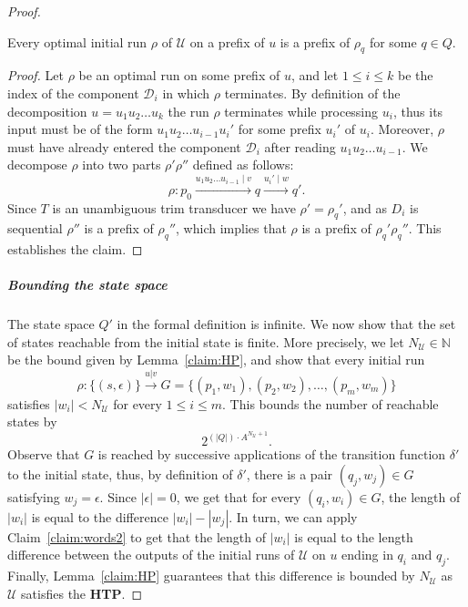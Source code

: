 \documentclass[a4paper,UKenglish,cleveref, autoref, thm-restate,authorcolumns, colorlinks]{lipics-v2021}
\newcommand\calD{\mathcal{D}}
\newcommand\calU{\mathcal{U}}
\newcommand{\HTP}[0]{\textbf{HTP}}
\begin{document}
{\begin{proof}
    \begin{claim}\label{claim:fin}
    Every optimal initial run $\rho$ of $\calU$ on a prefix of $u$
    is a prefix of $\rho_q$ for some  $q \in Q$.
    \end{claim}

    \begin{proof}
    Let $\rho$ be an optimal run on some prefix of $u$,
    and let $1 \leq i \leq k$ be the index of the component $\calD_i$ in which $\rho$ terminates.
    By definition of the decomposition $u = u_1 u_2 \dots u_k$ the run $\rho$ terminates while processing $u_i$,
    thus its input must be of the form $u_1 u_2 \dots u_{i-1} u_i'$
    for some prefix $u_i'$ of $u_i$.
    Moreover, $\rho$ must have already entered the component $\calD_i$
    after reading $u_1 u_2 \dots u_{i-1}$.
    We decompose $\rho$ into two parts $\rho'\rho''$ defined as follows:
    \[
        \rho: p_0 \xrightarrow{u_1 u_2 \dots u_{i-1} \mid v} q \xrightarrow{u_i' \mid w} q'.
    \]
    Since $T$ is an unambiguous trim transducer we have $\rho' = \rho_q'$,
    and as $D_i$ is sequential $\rho''$ is a prefix of $\rho_q''$, 
    which implies that $\rho$ is a prefix of $\rho_q' \rho_q''$.
    This establishes the claim.
    \end{proof}


   \subparagraph*{Bounding the state space}
    The state space $Q'$ in the formal definition is infinite.
    We now show that the set of states reachable from the initial state is finite.
    More precisely, we let $N_\calU \in \mathbb{N}$ be the bound given by Lemma~\ref{claim:HP},
    and show that every initial run
    \[
        \rho : \{(s,\epsilon)\} \xrightarrow{u|v} G =  \{(p_1,w_1), (p_2,w_2), \ldots, (p_m,w_m)\}
    \]
    satisfies $|w_i| < N_\calU$ for every $1 \leq i \leq m$.
    This bounds the number of reachable states by
    \[
    2^{(|Q|) \cdot A^{N_\calU+1}}.
    \]
    Observe that $G$ is reached by successive applications of the transition function $\delta'$
    to the initial state, thus,  by definition of $\delta'$, there is a pair $(q_j,w_j) \in G$
    satisfying $w_j = \epsilon$.
    Since $|\epsilon| = 0$,
    we get that for every $(q_i,w_i) \in G$,
    the length of $|w_i|$ is equal to the difference $|w_i| - |w_j|$.
    In turn, we can apply Claim~\ref{claim:words2} to get that the length of $|w_i|$ is equal to 
    the length difference between the outputs of the initial runs of $\calU$ on $u$
    ending in $q_i$ and $q_j$.
    Finally, Lemma~\ref{claim:HP}
    guarantees that this difference is bounded by $N_\calU$
    as $\calU$ satisfies the \HTP{}.
    

\end{proof}}
\end{document}
